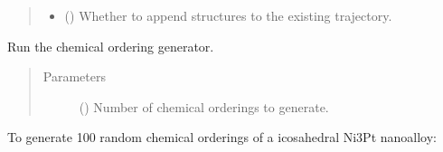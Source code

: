 \documentclass[letterpaper,10pt,english]{sphinxmanual}
\begin{document}
\begin{fulllineitems}
\begin{quote}
\begin{description}
\begin{itemize}
\item {} 
 (\sphinxstyleliteralemphasis{\sphinxupquote{, }}) \textendash{} Whether to append structures to the existing trajectory.

\end{itemize}

\end{description}\end{quote}

\begin{fulllineitems}
\label{\detokenize{build:acat.build.orderings.RandomOrderingGenerator.run}}
Run the chemical ordering generator.
\begin{quote}\begin{description}
\item[{Parameters}] \leavevmode
{} () \textendash{} Number of chemical orderings to generate.

\end{description}\end{quote}

\end{fulllineitems}


\end{fulllineitems}



To generate 100 random chemical orderings of a icosahedral Ni3Pt
nanoalloy:
\end{document}
